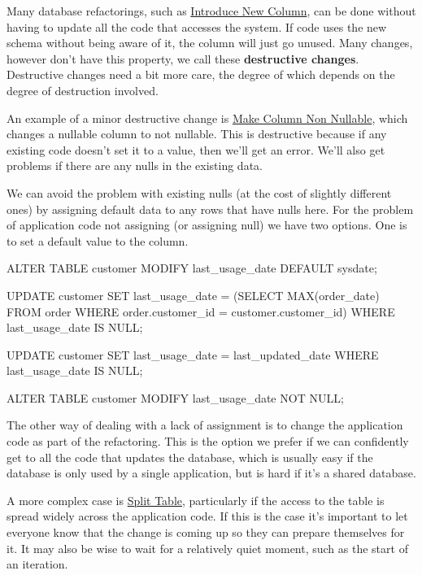 \documentclass[12pt]{article}
\begin{document}
Many database refactorings, such as
\href{http://databaserefactoring.com/IntroduceNewColumn.html}{Introduce
New Column}, can be done without having to update all the code that
accesses the system. If code uses the new schema without being aware of
it, the column will just go unused. Many changes, however don't have
this property, we call these {\bfseries{destructive changes}}. Destructive
changes need a bit more care, the degree of which depends on the degree
of destruction involved.

An example of a minor destructive change is
\href{http://databaserefactoring.com/MakeColumnNonNullable.html}{Make
Column Non Nullable}, which changes a nullable column to not nullable.
This is destructive because if any existing code doesn't set it to a
value, then we'll get an error. We'll also get problems if there are any
nulls in the existing data.

We can avoid the problem with existing nulls (at the cost of slightly
different ones) by assigning default data to any rows that have nulls
here. For the problem of application code not assigning (or assigning
null) we have two options. One is to set a default value to the column.

\begin{sqlcode}
ALTER TABLE customer
  MODIFY last_usage_date DEFAULT sysdate;

UPDATE customer
  SET last_usage_date =
    (SELECT MAX(order_date) FROM order
      WHERE order.customer_id = customer.customer_id)
  WHERE last_usage_date IS NULL;

UPDATE customer
  SET last_usage_date = last_updated_date
  WHERE last_usage_date IS NULL;

ALTER TABLE customer
  MODIFY last_usage_date NOT NULL;
\end{sqlcode}

The other way of dealing with a lack of assignment is to change the
application code as part of the refactoring. This is the option we
prefer if we can confidently get to all the code that updates the
database, which is usually easy if the database is only used by a single
application, but is hard if it's a shared database.

A more complex case is
\href{http://databaserefactoring.com/SplitTable.html}{Split Table},
particularly if the access to the table is spread widely across the
application code. If this is the case it's important to let everyone
know that the change is coming up so they can prepare themselves for it.
It may also be wise to wait for a relatively quiet moment, such as the
start of an iteration.
\end{document}
